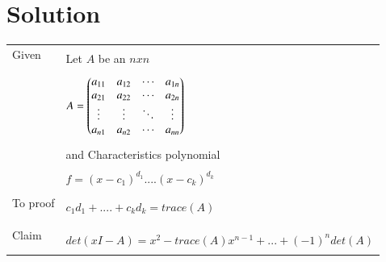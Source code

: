 \documentclass[journal,12pt]{IEEEtran}
\begin{document}
\section{\textbf{Solution}}
\begin{longtable}{|l|l|}
\hline
\multirow{3}{*}{Given} & \\
& Let $A$ be an $nxn$ \\
&\\
& $A = \begin{pmatrix}a_{11}&a_{12}&\cdots &a_{1n} \\
a_{21}&a_{22}&\cdots &a_{2n} \\
\vdots & \vdots & \ddots & \vdots\\
a_{n1}&a_{n2}&\cdots &a_{nn}\end{pmatrix}$\\
&\\
& and Characteristics polynomial\\
&\\
&  $f= (x-c_1)^{d_1}....(x-c_k)^{d_k}$\\
&\\
\hline
\multirow{3}{*}{To proof} & \\
& $c_1d_1+....+c_kd_k = trace(A)$\\
&\\
\hline
&\\
\multirow{3}{*}{Claim} & \\
&  $det(xI-A) = x^2 - trace(A)x^{n-1}+...+(-1)^ndet(A)$ \\
&\\
\hline
\end{longtable}
\newpage
\renewcommand{\thetable}{1}
\end{document}
